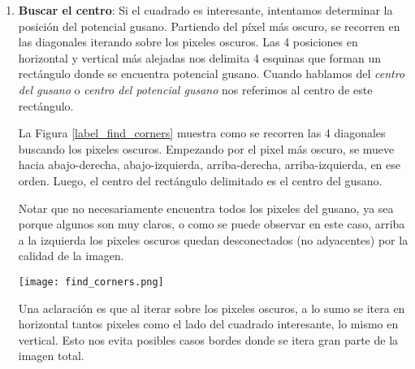 \documentclass{article}
\begin{document}
\begin{enumerate}
\hspace{0.2cm} En la figura \ref{label_step_4} se pueden ver dos cuadrados. En el de arriba, la columna más clara tiene casi exactamente la misma intensidad que el pixel más oscuro, mientras que en el de abajo, la columna mas clara tiene una intensidad notablemente distinta al pixel más oscuro.

\begin{figure*}[h]
    \centering
    \texttt{[image: Step\_4.png]}
    \caption{columna mas clara}
    \label{label_step_4}
\end{figure*}

\item \textbf{Buscar el centro}: Si el cuadrado es interesante, intentamos determinar la posición del potencial gusano. Partiendo del píxel más oscuro, se recorren en las diagonales iterando sobre los pixeles oscuros. Las 4 posiciones en horizontal y vertical más alejadas nos delimita 4 esquinas que forman un rectángulo donde se encuentra potencial gusano. Cuando hablamos del \emph{centro del gusano} o \emph{centro del potencial gusano} nos referimos al centro de este rectángulo.

\hspace{0.2cm} La Figura \ref{label_find_corners} muestra como se recorren las 4 diagonales buscando los pixeles oscuros. Empezando por el pixel más oscuro, se mueve hacia abajo-derecha, abajo-izquierda, arriba-derecha, arriba-izquierda, en ese orden. Luego, el centro del rectángulo delimitado es el centro del gusano. 

\hspace{0.2cm} Notar que no necesariamente encuentra todos los pixeles del gusano, ya sea porque algunos son muy claros, o como se puede observar en este caso, arriba a la izquierda los pixeles oscuros quedan desconectados (no adyacentes) por la calidad de la imagen.
\begin{figure*}[h]
    \centering
    \texttt{[image: find\_corners.png]}
    \caption{Encontrando la forma del gusano}
    \label{label_find_corners}
\end{figure*}

\hspace{0.2cm} Una aclaración es que al iterar sobre los pixeles oscuros, a lo sumo se itera en horizontal tantos pixeles como el lado del cuadrado interesante, lo mismo en vertical. Esto nos evita posibles casos bordes donde se itera gran parte de la imagen total.


\end{enumerate}
\end{document}
